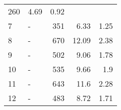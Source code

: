 \begin{longtable}{lXrrr}
       \num{260} &
       \num[round-mode=places,round-precision=2]{4,69} &
         \num[round-mode=places,round-precision=2]{0,92} \\

     7 &
     \multicolumn{1}{X}{ -  } &


       \num{351} &
       \num[round-mode=places,round-precision=2]{6,33} &
         \num[round-mode=places,round-precision=2]{1,25} \\

     8 &
     \multicolumn{1}{X}{ -  } &


       \num{670} &
       \num[round-mode=places,round-precision=2]{12,09} &
         \num[round-mode=places,round-precision=2]{2,38} \\

     9 &
     \multicolumn{1}{X}{ -  } &


       \num{502} &
       \num[round-mode=places,round-precision=2]{9,06} &
         \num[round-mode=places,round-precision=2]{1,78} \\

     10 &
     \multicolumn{1}{X}{ -  } &


       \num{535} &
       \num[round-mode=places,round-precision=2]{9,66} &
         \num[round-mode=places,round-precision=2]{1,9} \\

     11 &
     \multicolumn{1}{X}{ -  } &


       \num{643} &
       \num[round-mode=places,round-precision=2]{11,6} &
         \num[round-mode=places,round-precision=2]{2,28} \\

     12 &
     \multicolumn{1}{X}{ -  } &


       \num{483} &
       \num[round-mode=places,round-precision=2]{8,72} &
         \num[round-mode=places,round-precision=2]{1,71} \\


\end{longtable}
